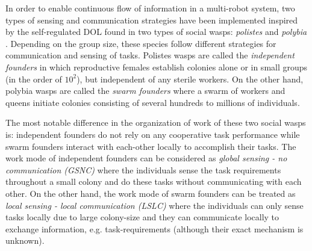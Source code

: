 In order to enable continuous flow of information in a multi-robot system, two types of sensing and communication strategies have been implemented inspired by the self-regulated DOL found in two types of social wasps: {\em polistes} and {\em polybia} \cite{Jeanne1999}. Depending on the group size, these species follow different strategies for communication and sensing of tasks. Polistes wasps are called the {\em independent founders} in which reproductive females establish colonies alone or in small groups (in the order of $10^2$), but independent of any sterile workers. On the other hand, polybia wasps are called the {\em swarm founders} where a swarm of workers and queens initiate colonies consisting of several hundreds to millions of individuals.

The most notable difference in the organization of work of these two social wasps is: independent founders do not rely on any cooperative task performance while swarm founders interact with each-other locally to accomplish their tasks. The work mode of independent founders can be considered as {\em global sensing - no communication (GSNC)} where the individuals sense the task requirements throughout a small colony and do these tasks without communicating with each other. On the other hand, the work mode of swarm founders can be treated as {\em local sensing - local communication (LSLC)} where the individuals can only sense tasks locally due to large colony-size and they can communicate locally to exchange information, e.g. task-requirements (although their exact mechanism is unknown).

